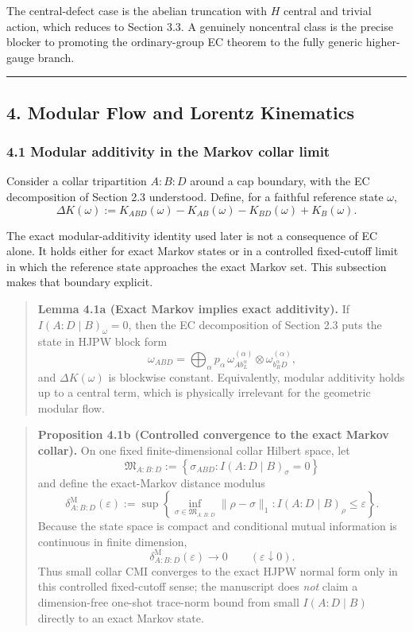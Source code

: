 The central-defect case is the abelian truncation with \(H\) central and trivial action, which reduces to Section 3.3. A genuinely noncentral class is the precise blocker to promoting the ordinary-group EC theorem to the fully generic higher-gauge branch.

\begin{center}\rule{0.5\linewidth}{0.5pt}\end{center}
\subsection{4. Modular Flow and Lorentz Kinematics}\label{4-modular-flow-and-lorentz-kinematics}

\subsubsection{4.1 Modular additivity in the Markov collar limit}\label{41-modular-additivity-in-the-markov-collar-limit}

Consider a collar tripartition \(A:B:D\) around a cap boundary, with the EC decomposition of Section 2.3 understood. Define, for a faithful reference state \(\omega\),
\[
\Delta K(\omega)
:=
K_{ABD}(\omega)-K_{AB}(\omega)-K_{BD}(\omega)+K_B(\omega).
\]

The exact modular-additivity identity used later is not a consequence of EC alone. It holds either for exact Markov states or in a controlled fixed-cutoff limit in which the reference state approaches the exact Markov set. This subsection makes that boundary explicit.

\begin{quote}
\textbf{Lemma 4.1a (Exact Markov implies exact additivity).} If \(I(A:D \mid B)_\omega = 0\), then the EC decomposition of Section 2.3 puts the state in HJPW block form
\[
\omega_{ABD}
=
\bigoplus_{\alpha}
p_{\alpha}\,
\omega^{(\alpha)}_{A b_L^{\alpha}}
\otimes
\omega^{(\alpha)}_{b_R^{\alpha} D},
\]
and \(\Delta K(\omega)\) is blockwise constant. Equivalently, modular additivity holds up to a central term, which is physically irrelevant for the geometric modular flow.
\end{quote}

\begin{quote}
\textbf{Proposition 4.1b (Controlled convergence to the exact Markov collar).} On one fixed finite-dimensional collar Hilbert space, let
\[
\mathfrak M_{A:B:D}
:=
\left\{
\sigma_{ABD}: I(A:D\mid B)_\sigma=0
\right\}
\]
and define the exact-Markov distance modulus
\[
\delta^{\mathrm M}_{A:B:D}(\varepsilon)
:=
\sup\left\{
\inf_{\sigma\in\mathfrak M_{A:B:D}}\|\rho-\sigma\|_1:
I(A:D\mid B)_\rho\le \varepsilon
\right\}.
\]
Because the state space is compact and conditional mutual information is continuous in finite dimension,
\[
\delta^{\mathrm M}_{A:B:D}(\varepsilon)\longrightarrow 0
\qquad
(\varepsilon\downarrow0).
\]
Thus small collar CMI converges to the exact HJPW normal form only in this controlled fixed-cutoff sense; the manuscript does \emph{not} claim a dimension-free one-shot trace-norm bound from small \(I(A:D\mid B)\) directly to an exact Markov state.
\end{quote}

